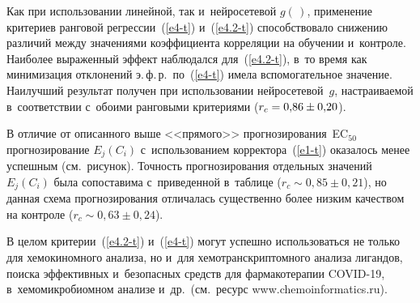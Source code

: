 \begin{multicols}{2}
     
     Как при использовании линейной, так и~нейросетевой $g(\,)$, применение 
критериев ранговой регрессии~(\ref{e4-t}) и~(\ref{e4.2-t}) способствовало 
снижению различий между значениями коэффициента корреляции на обучении 
и~контроле. Наиболее выраженный эффект наблюдался для~(\ref{e4.2-t}), в~то 
время как минимизация отклонений э.\,ф.\,р.\ по~(\ref{e4-t}) имела 
вспомогательное значение. Наилучший результат получен при использовании 
нейросетевой~$g$, настраиваемой в~соответствии с~обоими ранговыми 
критериями ($r_c\hm= 0{,}86\pm0{,}20$).
     
     В отличие от описанного выше <<прямого>> 
прогнозирования~EC$_{50}$ прогнозирование $E_j(C_i)$ с~использованием 
корректора~(\ref{e1-t}) оказалось менее успешным (см.\ рисунок). Точ\-ность 
прогнозирования отдельных значений $E_j(C_i)$ была сопоставима 
с~приведенной в~таблице ($r_c\sim 0{,}85\pm0{,}21$), но данная схема 
прогнозирования отличалась существенно более низким качеством на контроле 
($r_c\sim 0{,}63\pm0{,}24$). 


     
     
     В целом критерии~(\ref{e4.2-t}) и~(\ref{e4-t}) могут успешно 
использоваться не только для хемокиномного анализа, но и~для 
хемотранскриптомного анализа лигандов, поиска эффективных и~безопасных 
средств для фармакотерапии COVID-19, в~хемомикробиомном анализе и~др.\ 
(см.\ ресурс {\sf www.chemoinformatics.ru}). 

\end{multicols}

